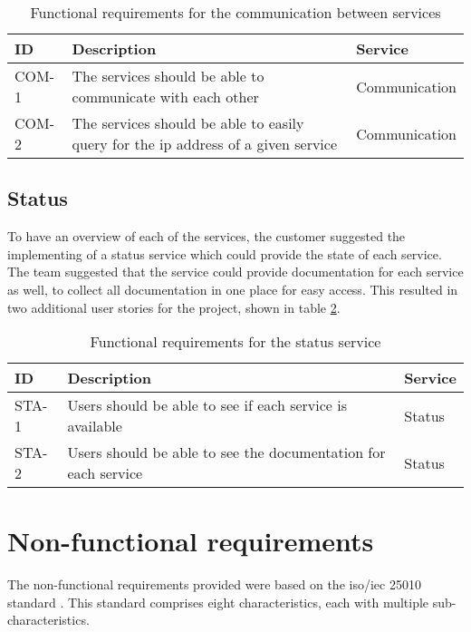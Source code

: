 \begin{table}[H] 
   \caption{Functional requirements for the communication between services}
   \centering
   \label{table:reqCom}
   \begin{tabular}{|p{1.3cm}|p{9.5cm}|p{4cm}|}\hline%
        ID & Description & Service\\\hline\hline
        COM-1 & The services should be able to communicate with each other & Communication \\ \hline
        COM-2 & The services should be able to easily query for the \acrshort{ip} address of a given service & Communication \\ \hline
    \end{tabular}
\end{table}

\subsection{Status}
To have an overview of each of the services, the customer suggested the implementing of a status service which could provide the state of each service. The team suggested that the service could provide documentation for each service as well, to collect all documentation in one place for easy access. This resulted in two additional user stories for the project, shown in table \ref{table:reqStat}.

\begin{table}[H]
    \caption{Functional requirements for the status service}
    \centering
    \label{table:reqStat}
    \begin{tabular}{ | p{1.3cm} | p{9.5cm} | p{4cm} | }
         \hline
         ID & Description & Service \\ \hline\hline
         
         STA-1 & Users should be able to see if each service is available & Status \\ \hline
         STA-2 & Users should be able to see the documentation for each service & Status \\ \hline
    \end{tabular}
\end{table}

\section{Non-functional requirements} \label{sec:nonFunctionalRequirements}
The non-functional requirements provided were based on the \acrshort{iso}/\acrshort{iec} 25010 standard \citep{iso25010}. This standard comprises eight characteristics, each with multiple sub-characteristics.

